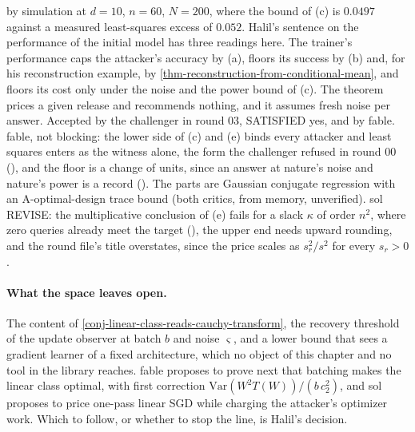 \begin{theorem}
{by simulation at $d=10$, $n=60$, $N=200$, where the bound of (c) is $0.0497$ against a
measured least-squares excess of $0.052$. Halil's sentence on the performance of the
initial model has three readings here. The trainer's performance caps the attacker's
accuracy by (a), floors its success by (b) and, for his reconstruction example, by
\cref{thm-reconstruction-from-conditional-mean}, and floors its cost only under the
noise and the power bound of (c). The theorem prices a given release and recommends
nothing, and it assumes fresh noise per answer. Accepted by the challenger in round 03,
SATISFIED yes, and by fable. fable, not blocking: the lower side of (c) and (e) binds
every attacker and least squares enters as the witness alone, the form the challenger
refused in round 00 (), and the floor is a change of
units, since an answer at nature's noise and nature's power is a record
(). The parts are Gaussian conjugate regression with
an A-optimal-design trace bound (both critics, from memory, unverified). sol REVISE:
the multiplicative conclusion of (e) fails for a slack $\kappa$ of order $n^2$, where
zero queries already meet the target (), the upper end
needs upward rounding, and the round file's title overstates, since the price scales as
$s_r^2/s^2$ for every $s_r>0$.}
\end{theorem}

\paragraph{What the space leaves open.} The content of
\cref{conj-linear-class-reads-cauchy-transform}, the recovery threshold of the update
observer at batch $b$ and noise $\varsigma$, and a lower bound that sees a gradient
learner of a fixed architecture, which no object of this chapter and no tool in the
library reaches. fable proposes to prove next that batching makes the linear class
optimal, with first correction $\mathrm{Var}(W^2T(W))/(b\,c_2^2)$, and sol proposes to
price one-pass linear SGD while charging the attacker's optimizer work. Which to follow,
or whether to stop the line, is Halil's decision.
